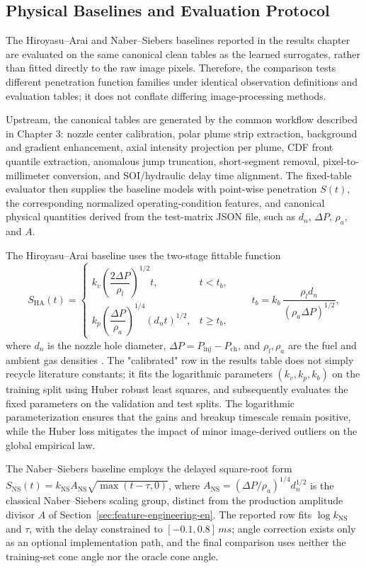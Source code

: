 \subsection{Physical Baselines and Evaluation Protocol}
\label{sec:baseline-fitting-protocol-en}

The Hiroyasu--Arai and Naber--Siebers baselines reported in the results chapter are evaluated on the same canonical clean tables as the learned surrogates, rather than fitted directly to the raw image pixels. Therefore, the comparison tests different penetration function families under identical observation definitions and evaluation tables; it does not conflate differing image-processing methods.

Upstream, the canonical tables are generated by the common workflow described in Chapter 3: nozzle center calibration, polar plume strip extraction, background and gradient enhancement, axial intensity projection per plume, CDF front quantile extraction, anomalous jump truncation, short-segment removal, pixel-to-millimeter conversion, and SOI/hydraulic delay time alignment. The fixed-table evaluator then supplies the baseline models with point-wise penetration $S(t)$, the corresponding normalized operating-condition features, and canonical physical quantities derived from the test-matrix JSON file, such as $d_n$, $\Delta P$, $\rho_a$, and $A$.

The Hiroyasu--Arai baseline uses the two-stage fittable function
\[
S_{\mathrm{HA}}(t)=
\begin{cases}
k_v \left( \dfrac{2\Delta P}{\rho_l} \right)^{1/2}t,
& t<t_b,\\[6pt]
k_p \left( \dfrac{\Delta P}{\rho_a} \right)^{1/4}(d_n t)^{1/2},
& t\ge t_b,
\end{cases}
\qquad
t_b=k_b\,\frac{\rho_l d_n}{(\rho_a\Delta P)^{1/2}},
\]
where $d_n$ is the nozzle hole diameter, $\Delta P=P_{\mathrm{inj}}-P_{\mathrm{ch}}$, and $\rho_l,\rho_a$ are the fuel and ambient gas densities \cite{HiroyasuArai1990}. The "calibrated" row in the results table does not simply recycle literature constants; it fits the logarithmic parameters $(k_v,k_p,k_b)$ on the training split using Huber robust least squares, and subsequently evaluates the fixed parameters on the validation and test splits. The logarithmic parameterization ensures that the gains and breakup timescale remain positive, while the Huber loss mitigates the impact of minor image-derived outliers on the global empirical law.

The Naber--Siebers baseline employs the delayed square-root form $S_{\mathrm{NS}}(t)=k_{\mathrm{NS}}A_{\mathrm{NS}}\sqrt{\max(t-\tau,0)}$, where $A_{\mathrm{NS}}=(\Delta P/\rho_a)^{1/4}d_n^{1/2}$ is the classical Naber--Siebers scaling group, distinct from the production amplitude divisor $A$ of Section~\ref{sec:feature-engineering-en}. The reported row fits $\log k_{\mathrm{NS}}$ and $\tau$, with the delay constrained to $[-0.1,0.8]\,\si{ms}$; angle correction exists only as an optional implementation path, and the final comparison uses neither the training-set cone angle nor the oracle cone angle.


